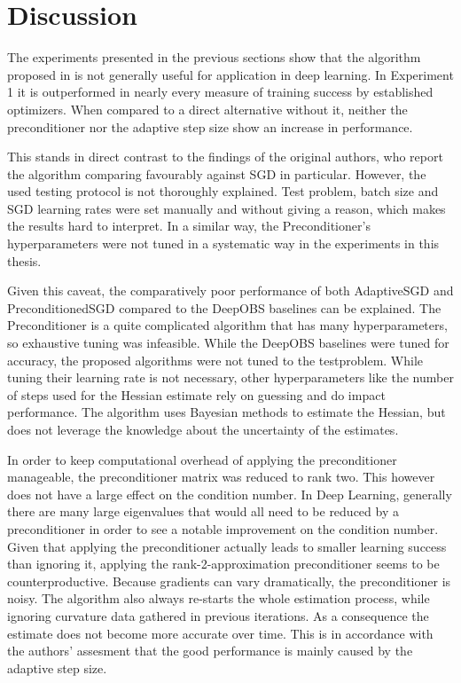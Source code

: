 \documentclass[twoside,12pt,a4paper]{report}
\begin{document}
\section{Discussion}
The experiments presented in the previous sections show that the algorithm proposed in \cite{roos2019active} is not generally useful for application in deep learning. In Experiment 1 it is outperformed in nearly every measure of training success by established optimizers. When compared to a direct alternative without it, neither the preconditioner nor the adaptive step size show an increase in performance.

This stands in direct contrast to the findings of the original authors, who report the algorithm comparing favourably against SGD in particular. However, the used testing protocol is not thoroughly explained. Test problem, batch size and SGD learning rates were set manually and without giving a reason, which makes the results hard to interpret. In a similar way, the Preconditioner's hyperparameters were not tuned in a systematic way in the experiments in this thesis.

Given this caveat, the comparatively poor performance of both AdaptiveSGD and PreconditionedSGD compared to the DeepOBS baselines can be explained. The Preconditioner is a quite complicated algorithm that has many hyperparameters, so exhaustive tuning was infeasible. While the DeepOBS baselines were tuned for accuracy, the proposed algorithms were not tuned to the testproblem. While tuning their learning rate is not necessary, other hyperparameters like the number of steps used for the Hessian estimate rely on guessing and do impact performance. The algorithm uses Bayesian methods to estimate the Hessian, but does not leverage the knowledge about the uncertainty of the estimates.

In order to keep computational overhead of applying the preconditioner manageable, the preconditioner matrix was reduced to rank two. This however does not have a large effect on the condition number. In Deep Learning, generally there are many large eigenvalues that would all need to be reduced by a preconditioner in order to see a notable improvement on the condition number. Given that applying the preconditioner actually leads to smaller learning success than ignoring it, applying the rank-2-approximation preconditioner seems to be counterproductive. Because gradients can vary dramatically, the preconditioner is noisy. The algorithm also always re-starts the whole estimation process, while ignoring curvature data gathered in previous iterations. As a consequence the estimate does not become more accurate over time. This is in accordance with the authors' assesment that the good performance is mainly caused by the adaptive step size.
\end{document}
